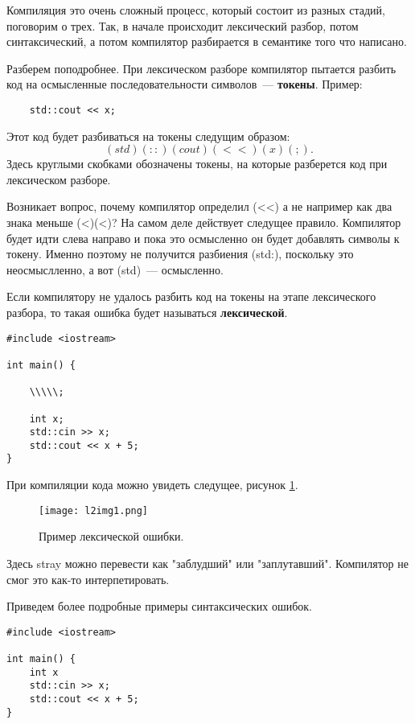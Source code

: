 Компиляция это очень сложный процесс, который состоит из разных стадий, поговорим о трех.
Так, в начале происходит лексический разбор, потом синтаксический, а потом компилятор разбирается в семантике того что написано.

Разберем поподробнее. При лексическом разборе компилятор пытается разбить код на осмысленные последовательности символов~--- \textbf{токены}.
Пример:
\begin{verbatim}
    std::cout << x;
\end{verbatim}

Этот код будет разбиваться на токены следущим образом:
\[(std) (::) (cout) (<<) (x) (;).\]
Здесь круглыми скобками обозначены токены, на которые разберется код при лексическом разборе.

Возникает вопрос, почему компилятор определил (<<) а не например как два знака меньше (<)(<)?
На самом деле действует следущее правило. Компилятор будет идти слева направо и пока это осмысленно он будет добавлять символы к токену.
Именно поэтому не получится разбиения (std:), поскольку это неосмыслленно, а вот (std)~--- осмысленно.

Если компилятору не удалось разбить код на токены на этапе лексического разбора, то такая ошибка будет называться \textbf{лексической}.

\begin{verbatim}
#include <iostream>

int main() {

    \\\\\;

    int x;
    std::cin >> x;
    std::cout << x + 5;
}
\end{verbatim}

При компиляции кода можно увидеть следущее, рисунок \ref{l2img1}.

\begin{figure}[h]
    \centering
    \texttt{[image: l2img1.png]}
    \caption{Пример лексической ошибки.}
    \label{l2img1}
\end{figure}

Здесь stray можно перевести как "заблудший" или "заплутавший". Компилятор не смог это как-то интерпетировать.

Приведем более подробные примеры синтаксических ошибок.

\begin{verbatim}
#include <iostream>

int main() {
    int x
    std::cin >> x;
    std::cout << x + 5;
}
\end{verbatim}

